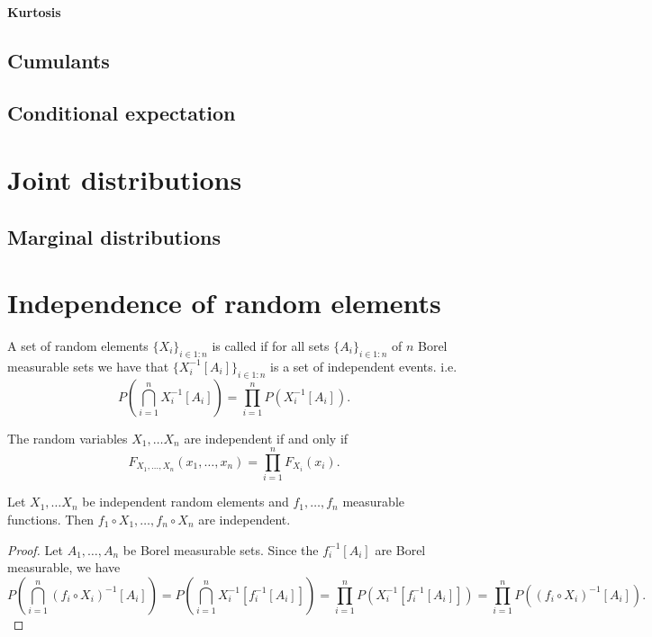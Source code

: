 \paragraph{Kurtosis}
\subsection{Cumulants}

\subsection{Conditional expectation}

\section{Joint distributions}
\subsection{Marginal distributions}

\section{Independence of random elements}
\begin{definition}
A set of random elements $\{X_i\}_{i\in 1:n}$ is called  if for all sets $\{A_i\}_{i\in 1:n}$ of $n$ Borel measurable sets we have that $\{X_i^{-1}[A_i]\}_{i\in 1:n}$ is a set of independent events. i.e.
\[ P\left(\bigcap_{i=1}^n X_i^{-1}[A_i]\right) = \prod_{i=1}^n P(X_i^{-1}[A_i]). \]
\end{definition}

\begin{proposition}
The random variables $X_1, \ldots X_n$ are independent \textup{if and only if}
\[ F_{X_1,\ldots, X_n}(x_1, \ldots, x_n) = \prod_{i=1}^n F_{X_i}(x_i). \]
\end{proposition}

\begin{proposition}
Let $X_1, \ldots X_n$ be independent random elements and $f_1, \ldots, f_n$ measurable functions. Then $f_1\circ X_1, \ldots, f_n\circ X_n$ are independent.
\end{proposition}
\begin{proof}
Let $A_1, \ldots, A_n$ be Borel measurable sets. Since the $f_i^{-1}[A_i]$ are Borel measurable, we have
\[ P\left(\bigcap_{i=1}^n (f_i\circ X_i)^{-1}[A_i]\right) = P\left(\bigcap_{i=1}^n X_i^{-1}[f^{-1}_i[A_i]]\right) = \prod_{i=1}^n P(X_i^{-1}[f^{-1}_i[A_i]]) = \prod_{i=1}^n P((f_i\circ X_i)^{-1}[A_i]). \]
\end{proof}

